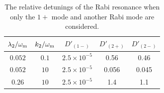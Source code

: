 
\begin{table}
    \centering
    \small
    \setlength\tabcolsep{10pt}
    \begin{tabular}{c | c | c | c | c }
    \hline
    \hline
        $\lambda_2/\omega_\mathrm m$ & $k_2/\omega_\mathrm m$  & $D'_{(1-)}$ & $D'_{(2+)}$ & $D'_{(2-)}$ \\
    \hline
    $0.052$ & $0.1$ & $2.5\times 10^{-5}$ & 0.56 & 0.46 \\
    $0.052$ &  $10$ & $2.5\times 10^{-5}$ & 0.056 & 0.045  \\
    $0.26$ & $10$ &  $2.5\times 10^{-5}$ & 1.4 & 1.1 \\
    \hline
    \hline
    \end{tabular}
    \caption{\label{table:multi-frequency-rabi-simple-relative-detuning-destruction}The relative detunings of the Rabi resonance when only the $1+$ mode and another Rabi mode are considered.}
\end{table}



